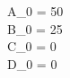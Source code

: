 \documentclass{article}
\begin{document}
\\
\\

A_0 = 50\\
B_0 = 25\\
C_0 = 0\\
D_0 = 0\\
\end{document}
